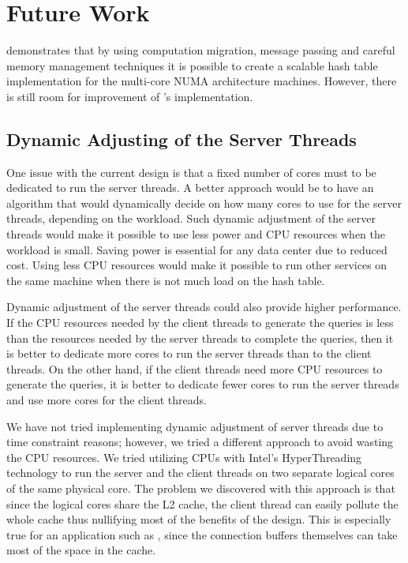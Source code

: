 \section{Future Work}
\label{chap:futurework}

\cphash{} demonstrates that by using computation migration, message passing and careful memory management techniques it is
possible to create a scalable hash table implementation for the multi-core NUMA architecture machines. However, there is still
room for improvement of \cphash{}'s implementation. 

\subsection{Dynamic Adjusting of the Server Threads}

One issue with the current design is that a fixed number of cores must to be dedicated to run the server threads. 
A better approach would be to have an algorithm that would dynamically decide on how many cores to use for the server threads, 
depending on the workload. Such dynamic adjustment of the server threads would make it possible to use less power and CPU resources
when the workload is small. Saving power is essential for any data center due to reduced cost. Using less CPU resources
would make it possible to run other services on the same machine when there is not much load on the hash table. 

Dynamic adjustment of the server threads could also provide higher performance. 
If the CPU resources needed by the client threads to generate the queries is less than the resources needed by the server threads 
to complete the queries, then it is better to dedicate more cores to run the server threads than to the client threads. 
On the other hand, if the client threads need more CPU resources to generate the queries, it is better to dedicate fewer cores to run
the server threads and use more cores for the client threads. 

We have not tried implementing dynamic adjustment of server threads due to time constraint reasons; however, we tried
a different approach to avoid wasting the CPU resources. We tried utilizing CPUs with Intel's HyperThreading technology to run 
the server and the client threads on two separate logical cores of the same physical core. The problem we discovered with this approach is that 
since the logical cores share the L2 cache, the client thread can easily pollute the whole cache thus nullifying most of the benefits of the \cphash{}
design. This is especially true for an application such as \cpserver{}, since the connection buffers themselves can take most of the space in the cache.

